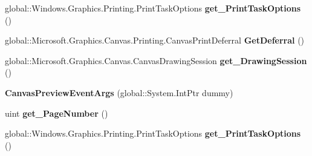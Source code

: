 \begin{DoxyCompactItemize}
\item 
\mbox{\label{class_microsoft_1_1_graphics_1_1_canvas_1_1_printing_1_1_canvas_preview_event_args_a62407eb61c4c702e3649d979f1eda285}} 
global\+::\+Windows.\+Graphics.\+Printing.\+Print\+Task\+Options {\bfseries get\+\_\+\+Print\+Task\+Options} ()
\item 
\mbox{\label{class_microsoft_1_1_graphics_1_1_canvas_1_1_printing_1_1_canvas_preview_event_args_a877d99bbaa60578acf4e13109782c656}} 
global\+::\+Microsoft.\+Graphics.\+Canvas.\+Printing.\+Canvas\+Print\+Deferral {\bfseries Get\+Deferral} ()
\item 
\mbox{\label{class_microsoft_1_1_graphics_1_1_canvas_1_1_printing_1_1_canvas_preview_event_args_afa5a185414d95a547b3b8d6de45864d6}} 
global\+::\+Microsoft.\+Graphics.\+Canvas.\+Canvas\+Drawing\+Session {\bfseries get\+\_\+\+Drawing\+Session} ()
\item 
\mbox{\label{class_microsoft_1_1_graphics_1_1_canvas_1_1_printing_1_1_canvas_preview_event_args_adfb508d68950ca5e6aba4bcb1b16375d}} 
{\bfseries Canvas\+Preview\+Event\+Args} (global\+::\+System.\+Int\+Ptr dummy)
\item 
\mbox{\label{class_microsoft_1_1_graphics_1_1_canvas_1_1_printing_1_1_canvas_preview_event_args_ae09b4efa9f3c47599cc48d99dc8f71f2}} 
uint {\bfseries get\+\_\+\+Page\+Number} ()
\item 
\mbox{\label{class_microsoft_1_1_graphics_1_1_canvas_1_1_printing_1_1_canvas_preview_event_args_a62407eb61c4c702e3649d979f1eda285}} 
global\+::\+Windows.\+Graphics.\+Printing.\+Print\+Task\+Options {\bfseries get\+\_\+\+Print\+Task\+Options} ()
\item 
\mbox{\label{class_microsoft_1_1_graphics_1_1_canvas_1_1_printing_1_1_canvas_preview_event_args_a877d99bbaa60578acf4e13109782c656}} 

\end{DoxyCompactItemize}

